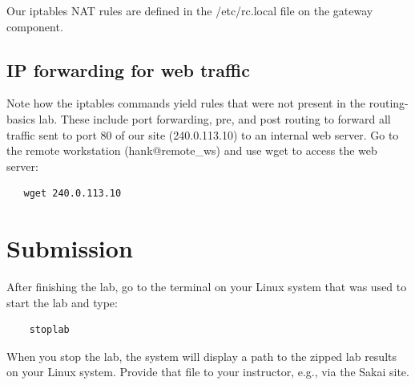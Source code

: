 Our iptables NAT rules are defined in the /etc/rc.local file on the gateway component.  

\subsection{IP forwarding for web traffic}
Note how the iptables commands yield rules that were not present in the routing-basics lab.  These include port forwarding,
pre, and post routing to forward all traffic sent to port 80 of our site (240.0.113.10) to an
internal web server.   Go to the remote workstation (hank@remote\_ws) and use wget to access the web server:
\begin{verbatim}
   wget 240.0.113.10
\end{verbatim}

\section{Submission}
After finishing the lab, go to the terminal on your Linux system that was used to start the lab and type:
\begin{verbatim}
    stoplab 
\end{verbatim}
When you stop the lab, the system will display a path to the zipped lab results on your Linux system.  Provide that file to 
your instructor, e.g., via the Sakai site.


